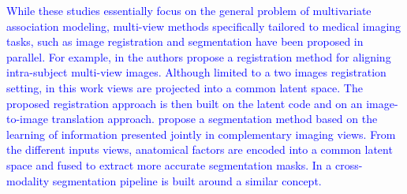 \textcolor{blue}{
	 While these studies essentially focus on the general problem of multivariate association modeling, multi-view methods specifically tailored to medical imaging tasks, such as image registration and segmentation have been proposed in parallel.
	 For example, in \cite{Qin2019} the authors propose
	 a registration method for aligning intra-subject multi-view images.
	 Although limited to a two images registration setting,
	 in this work views are projected into a common latent space.
	 The proposed registration approach is then built on the latent code and on an image-to-image translation approach.
	 \cite{Chartsias2021} propose a segmentation method based on the learning of information presented jointly in complementary imaging views.
	 From the different inputs views, anatomical factors are encoded into a common latent space and fused to extract more accurate segmentation masks.
	 In \cite{Yang2020} a cross-modality segmentation pipeline is built around a similar concept.
}
